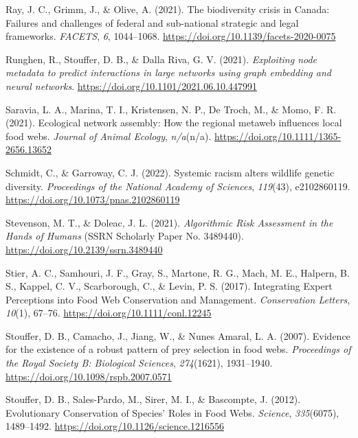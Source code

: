 \documentclass[10pt,oneside]{article}
\newlength{\cslhangindent}
\newenvironment{CSLReferences}[2] %
 {%
  \setlength{\parindent}{0pt}
  \ifodd #1 \everypar{\setlength{\hangindent}{\cslhangindent}}\ignorespaces\fi
  \ifnum #2 > 0
  \setlength{\parskip}{#2\baselineskip}
  \fi
 }%
 {}
\begin{document}
\begin{CSLReferences}{1}{0}
\leavevmode{}%
Ray, J. C., Grimm, J., \& Olive, A. (2021). The biodiversity crisis in
Canada: Failures and challenges of federal and sub-national strategic
and legal frameworks. \emph{FACETS}, \emph{6}, 1044--1068.
\url{https://doi.org/10.1139/facets-2020-0075}

\leavevmode{}%
Runghen, R., Stouffer, D. B., \& Dalla Riva, G. V. (2021).
\emph{Exploiting node metadata to predict interactions in large networks
using graph embedding and neural networks}.
\url{https://doi.org/10.1101/2021.06.10.447991}

\leavevmode{}%
Saravia, L. A., Marina, T. I., Kristensen, N. P., De Troch, M., \& Momo,
F. R. (2021). Ecological network assembly: How the regional metaweb
influences local food webs. \emph{Journal of Animal Ecology},
\emph{n/a}(n/a). \url{https://doi.org/10.1111/1365-2656.13652}

\leavevmode{}%
Schmidt, C., \& Garroway, C. J. (2022). Systemic racism alters wildlife
genetic diversity. \emph{Proceedings of the National Academy of
Sciences}, \emph{119}(43), e2102860119.
\url{https://doi.org/10.1073/pnas.2102860119}

\leavevmode{}%
Stevenson, M. T., \& Doleac, J. L. (2021). \emph{Algorithmic Risk
Assessment in the Hands of Humans} (SSRN Scholarly Paper No. 3489440).
\url{https://doi.org/10.2139/ssrn.3489440}

\leavevmode{}%
Stier, A. C., Samhouri, J. F., Gray, S., Martone, R. G., Mach, M. E.,
Halpern, B. S., Kappel, C. V., Scarborough, C., \& Levin, P. S. (2017).
Integrating Expert Perceptions into Food Web Conservation and
Management. \emph{Conservation Letters}, \emph{10}(1), 67--76.
\url{https://doi.org/10.1111/conl.12245}

\leavevmode{}%
Stouffer, D. B., Camacho, J., Jiang, W., \& Nunes Amaral, L. A. (2007).
Evidence for the existence of a robust pattern of prey selection in food
webs. \emph{Proceedings of the Royal Society B: Biological Sciences},
\emph{274}(1621), 1931--1940.
\url{https://doi.org/10.1098/rspb.2007.0571}

\leavevmode{}%
Stouffer, D. B., Sales-Pardo, M., Sirer, M. I., \& Bascompte, J. (2012).
Evolutionary Conservation of Species' Roles in Food Webs.
\emph{Science}, \emph{335}(6075), 1489--1492.
\url{https://doi.org/10.1126/science.1216556}


\end{CSLReferences}
\end{document}

